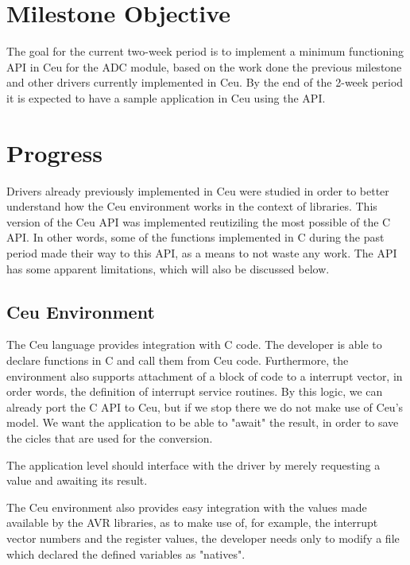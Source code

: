 \documentclass{article}
\begin{document}
\section{Milestone Objective}

\tab The goal for the current two-week period is to implement a minimum functioning API in Ceu for the ADC module, based on the work done the previous milestone and other drivers currently implemented in Ceu. By the end of the 2-week period it is expected to have a sample application in Ceu using the API.

\section{Progress}
\tab Drivers already previously implemented in Ceu were studied in order to better understand how the Ceu environment works in the context of libraries. This version of the Ceu API was implemented reutiziling the most possible of the C API. In other words, some of the functions implemented in C during the past period made their way to this API, as a means to not waste any work. The API has some apparent limitations, which will also be discussed below.  

\subsection{Ceu Environment}
\tab The Ceu language provides integration with C code. The developer is able to declare functions in C and call them from Ceu code. Furthermore, the environment also supports attachment of a block of code to a interrupt vector, in order words, the definition of interrupt service routines. By this logic, we can already port the C API to Ceu, but if we stop there we do not make use of Ceu's model. We want the application to be able to "await" the result, in order to save the cicles that are used for the conversion.
\par The application level should interface with the driver by merely requesting a value and awaiting its result.
\par The Ceu environment also provides easy integration with the values made available by the AVR libraries, as to make use of, for example, the interrupt vector numbers and the register values, the developer needs only to modify a file which declared the defined variables as "natives".
\end{document}
